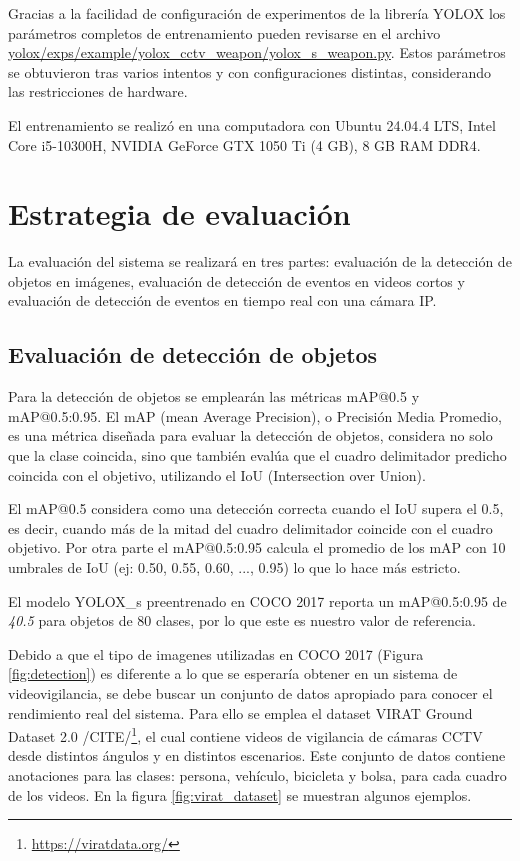 \documentclass[11pt,a4paper]{article}
\begin{document}
Gracias a la facilidad de configuración de experimentos de la librería YOLOX los parámetros completos de entrenamiento pueden revisarse en el archivo \url{yolox/exps/example/yolox\_cctv\_weapon/yolox\_s\_weapon.py}. Estos parámetros se obtuvieron tras varios intentos y con configuraciones distintas, considerando las restricciones de hardware.

El entrenamiento se realizó en una computadora con Ubuntu 24.04.4 LTS, Intel Core i5-10300H, NVIDIA GeForce GTX 1050 Ti (4 GB), 8 GB RAM DDR4.

\section{Estrategia de evaluación}

La evaluación del sistema se realizará en tres partes: evaluación de la detección de objetos en imágenes, evaluación de detección de eventos en videos cortos y evaluación de detección de eventos en tiempo real con una cámara IP.

\subsection{Evaluación de detección de objetos}

Para la detección de objetos se emplearán las métricas mAP@0.5 y mAP@0.5:0.95. El mAP (mean Average Precision), o Precisión Media Promedio, es una métrica diseñada para evaluar la detección de objetos, considera no solo que la clase coincida, sino que también evalúa que el cuadro delimitador predicho coincida con el objetivo, utilizando el IoU (Intersection over Union).

El mAP@0.5 considera como una detección correcta cuando el IoU supera el 0.5, es decir, cuando más de la mitad del cuadro delimitador coincide con el cuadro objetivo. Por otra parte el mAP@0.5:0.95 calcula el promedio de los mAP con 10 umbrales de IoU (ej: 0.50, 0.55, 0.60, ..., 0.95) lo que lo hace más estricto.

El modelo YOLOX\_s preentrenado en COCO 2017 reporta un mAP@0.5:0.95 de \textit{40.5} para objetos de 80 clases, por lo que este es nuestro valor de referencia.

Debido a que el tipo de imagenes utilizadas en COCO 2017 (Figura \ref{fig:detection}) es diferente a lo que se esperaría obtener en un sistema de videovigilancia, se debe buscar un conjunto de datos apropiado para conocer el rendimiento real del sistema. Para ello se emplea el dataset VIRAT Ground Dataset 2.0 /CITE/\footnote{\url{https://viratdata.org/}}, el cual contiene videos de vigilancia de cámaras CCTV desde distintos ángulos y en distintos escenarios. Este conjunto de datos contiene anotaciones para las clases: persona, vehículo, bicicleta y bolsa, para cada cuadro de los videos. En la figura \ref{fig:virat_dataset} se muestran algunos ejemplos.
\end{document}

